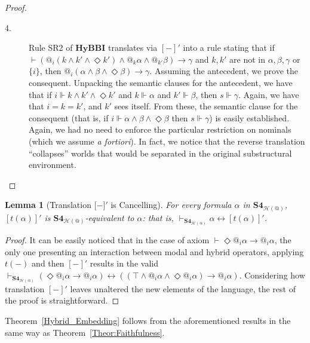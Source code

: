\documentclass[a4paper]{article}
\newtheorem{lemma}[theorem]{Lemma}
\newcommand{\SFour}{\textbf{S4}\xspace}
\newcommand{\rev}[1]{[#1]'}
\begin{document}
\begin{proof}
\begin{description}
        \item[4.] Rule SR2 of $\textbf{HyBBI}$ translates via $\rev{-}$ into a rule stating that if $\vdash (@_i(k \land k' \land \Diamond k')\land @_k\alpha\land@_{k'}\beta)\rightarrow \gamma$ and $k, k'$ are not in $\alpha, \beta, \gamma$ or $\{i\}$, then $@_i(\alpha \land \beta \land \Diamond \beta)\rightarrow \gamma$. Assuming the antecedent, we prove the consequent. Unpacking the semantic clauses for the antecedent, we have that if $i\Vdash k \land k' \land \Diamond k'$ and $k\Vdash \alpha$ and $k'\Vdash \beta$, then $s\Vdash \gamma$. Again, we have that $i=k=k'$, and $k'$ sees itself. From these, the semantic clause for the consequent (that is, if $i\Vdash \alpha \land \beta \land \Diamond \beta$ then $s\Vdash \gamma$) is easily established. Again, we had no need to enforce the particular restriction on nominals (which we assume \textit{a fortiori}). In fact, we notice that the reverse translation ``collapses'' worlds that would be separated in the original substructural environment.


        
    \end{description}
   
\end{proof}

\begin{lemma}[Translation ${[}-{]}'$ is Cancelling]\label{Theor:Faithfulnes_2_HyBBI}
For every formula $\alpha$ in $\SFour_{\mathcal{H}(@)}$, $\rev{t(\alpha)}$ is $\SFour_{\mathcal{H}(@)}$-equivalent to $\alpha$: that is, $\vdash_{\SFour_{\mathcal{H}(@)}} \alpha \leftrightarrow \rev{t(\alpha)}$.

\end{lemma}
\begin{proof}
It can be easily noticed that in the case of axiom $\vdash \Diamond @_i \alpha \rightarrow@_i \alpha$, the only one presenting an interaction between modal and hybrid operators, applying $t(-)$ and then $[-]'$ results in the valid $\vdash_{\SFour_{\mathcal{H}(@)}} (\Diamond @_i \alpha \rightarrow @_i \alpha) \leftrightarrow ((\top \land  @_i \alpha \land \Diamond @_i \alpha) \rightarrow@_i \alpha)$. Considering how translation $\rev{-}$ leaves unaltered the new elements of the language, the rest of the proof is straightforward.    
\end{proof}

Theorem~\ref{Hybrid_Embedding} follows from the aforementioned results in the same way as Theorem~\ref{Theor:Faithfulness}. 
\end{document}
